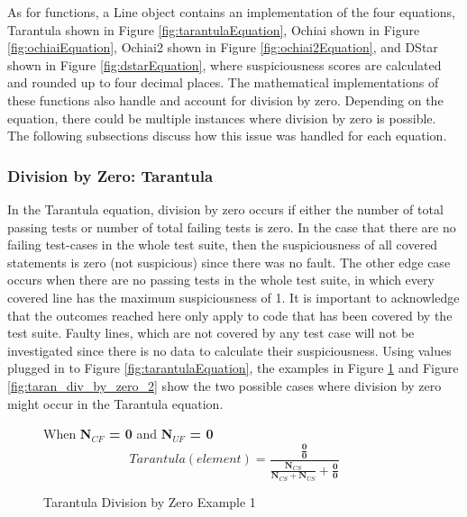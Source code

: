 As for functions, a Line object contains an implementation of the four
equations, Tarantula shown in Figure \ref{fig:tarantulaEquation}, Ochiai shown in
Figure \ref{fig:ochiaiEquation}, Ochiai2 shown in Figure \ref{fig:ochiai2Equation},
and DStar shown in Figure \ref{fig:dstarEquation},
where suspiciousness scores are calculated and rounded up to four decimal places.
The mathematical implementations of these functions also handle and account for
division by zero. Depending on the equation, there could be multiple instances
where division by zero is possible. The following subsections discuss how this
issue was handled for each equation.

\subsubsection{Division by Zero: Tarantula}
\label{subsubsec:div_by_zero_taran}
In the Tarantula equation, division by zero occurs if either the number of
total passing tests or number of total failing tests is zero. In the case that
there are no failing test-cases in the whole test suite, then the suspiciousness
of all covered statements is zero (not suspicious) since there was no fault. The
other edge case occurs when there are no passing tests in the whole test suite,
in which every covered line has the maximum suspiciousness of 1. It is important
to acknowledge that the outcomes reached here only apply to code that has been
covered by the test suite. Faulty lines, which are not covered by any test case
will not be investigated since there is no data to calculate their
suspiciousness. Using values plugged in to Figure \ref{fig:tarantulaEquation}, the
examples in Figure \ref{fig:taran_div_by_zero_1} and Figure \ref{fig:taran_div_by_zero_2} show
the two possible cases where division by zero might occur in the Tarantula
equation.

\begin{figure}[!htb]
	\begin{center}
        When \textbf{N$_{CF}$ = 0} and \textbf{N$_{UF}$ = 0 }
		\begin{equation}
			Tarantula(element) = \frac{\frac{\textbf{0}}{\textbf{0}}}{\frac{\textbf{N$_{CS}$}}{\textbf{N$_{CS}$}+\textbf{N$_{US}$}} + \frac{\textbf{0}}{\textbf{0}}}
		\end{equation}
		\caption{\label{fig:taran_div_by_zero_1} Tarantula Division by Zero Example 1}
	\end{center}
\end{figure}

